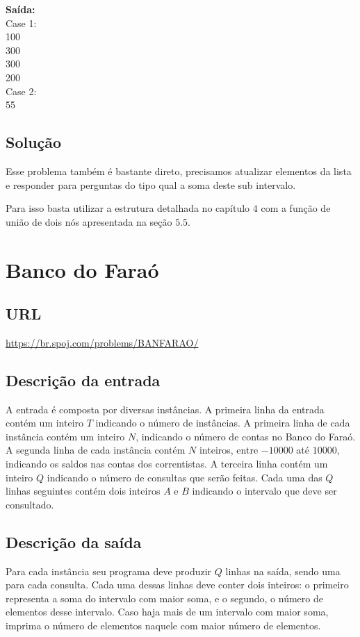 \textbf{Saída:} \\
Case 1: \\
100 \\
300 \\
300 \\
200 \\
Case 2: \\
55 \\

\subsection{Solução}
Esse problema também é bastante direto, precisamos atualizar elementos da lista e responder para perguntas do tipo qual a soma deste sub intervalo.

Para isso basta utilizar a estrutura detalhada no capítulo $4$ com a função de união de dois nós apresentada na seção $5.5$.

\section{Banco do Faraó}
\subsection{URL}
\url{https://br.spoj.com/problems/BANFARAO/}

\subsection{Descrição da entrada}
A entrada é composta por diversas instâncias. A primeira linha da entrada contém um inteiro $T$ indicando o número de instâncias.
A primeira linha de cada instância contém um inteiro $N$, indicando o número de contas no Banco do Faraó. A segunda linha de cada instância contém $N$ inteiros, entre $-10000$ até $10000$, indicando os saldos nas contas dos correntistas. A terceira linha contém um inteiro $Q$ indicando o número de consultas que serão feitas. Cada uma das $Q$ linhas seguintes contém dois inteiros $A$ e $B$ indicando o intervalo que deve ser consultado.

\subsection{Descrição da saída}
Para cada instância seu programa deve produzir $Q$ linhas na saída, sendo uma para cada consulta. Cada uma dessas linhas deve conter dois inteiros: o primeiro representa a soma do intervalo com maior soma, e o segundo, o número de elementos desse intervalo. Caso haja mais de um intervalo com maior soma, imprima o número de elementos naquele com maior número de elementos.


